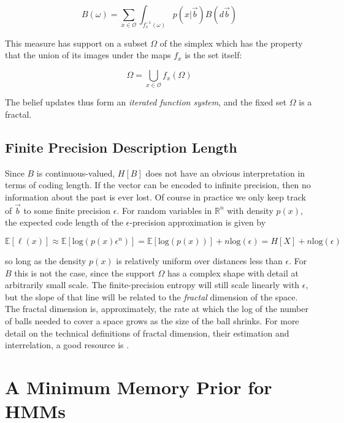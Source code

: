 \documentclass{article} %
\begin{document}
\begin{equation}
B(\omega) = \sum_{x\in\mathcal{O}} \int_{f_x^{-1}(\omega)} p(x|\vec{b}) B(d\vec{b})
\end{equation}

This measure has support on a subset $\Omega$ of the simplex which has the property that the union of its images under the maps $f_x$ is the set itself:

\begin{equation}
\Omega = \bigcup_{x\in\mathcal{O}} f_x(\Omega)
\end{equation}

The belief updates thus form an {\em iterated function system}, and the fixed set $\Omega$ is a fractal.  

\subsection{Finite Precision Description Length}

Since $B$ is continuous-valued, $H[B]$ does not have an obvious interpretation in terms of coding length.  If the vector can be encoded to infinite precision, then no information about the past is ever lost.  Of course in practice we only keep track of $\vec{b}$ to some finite precision $\epsilon$.  For random variables in $\mathbb{R}^n$ with density $p(x)$, the expected code length of the $\epsilon$-precision approximation is given by 

\begin{equation}
\mathbb{E}[\ell(x)] \approx \mathbb{E}[\mathrm{log}(p(x)\epsilon^n)] = \mathbb{E}[\mathrm{log}(p(x))] + n\mathrm{log}(\epsilon) = H[X] + n\mathrm{log}(\epsilon)
\end{equation}

so long as the density $p(x)$ is relatively uniform over distances less than $\epsilon$.  For $B$ this is not the case, since the support $\Omega$ has a complex shape with detail at arbitrarily small scale.  The finite-precision entropy will still scale linearly with $\epsilon$, but the slope of that line will be related to the {\em fractal} dimension of the space.  The fractal dimension is, approximately, the rate at which the log of the number of balls needed to cover a space grows as the size of the ball shrinks.  For more detail on the technical definitions of fractal dimension, their estimation and interrelation, a good resource is \cite{Falconer2003}.

\section{A Minimum Memory Prior for HMMs}
\end{document}
